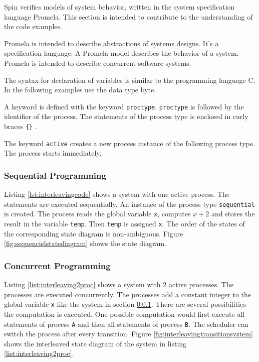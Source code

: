 \documentclass[12pt,a4paper,twoside]{article}
\begin{document}
Spin verifies models of system behavior, written in the system specification language Promela. This section is intended to contribute to the understanding of the code examples.

Promela is intended to describe abstractions of systems designs. It's a specification language. A Promela model describes the behavior of a system. Promela is intended to describe concurrent software systems.

The syntax for declaration of variables is similar to the programming language C. In the following examples use the data type byte.

A keyword is defined with the keyword \verb|proctype|. \verb|proctype| is followed by the identifier of the process. The statements of the process type is enclosed in curly braces \verb|{}| \cite{holzmann03}.

The keyword \verb|active| creates a new process instance of the following process type. The process starts immediately.

\subsubsection{Sequential Programming}
\label{sec:sequential}

Listing \ref{lst:interleavingcode} shows a system with one active process. The statements are executed sequentially. An instance of the process type \verb|sequential| is created. The process reads the global variable \verb|x|, computes $x+2$ and stores the result in the variable \verb|temp|. Then \verb|temp| is assigned \verb|x|. The order of the states of the corresponding state diagram is non-ambiguous. Figure \ref{fig:sequencielstatediagram} shows the state diagram.

   

\subsubsection{Concurrent Programming}
\label{sec:concurrent}

Listing \ref{list:interleaving2proc} shows a system with 2 active processes. The processes are executed concurrently. The processes add a constant integer to the global variable \verb|x| like the system in section \ref{sec:sequential}. There are several possibilities the computation is executed. One possible computation would first execute all statements of process \verb|A| and then all statements of process \verb|B|. The scheduler can switch the process after every transition. Figure \ref{fig:interleavingtransitionsystem} shows the interleaved state diagram of the system in listing \ref{list:interleaving2proc}.
\end{document}
